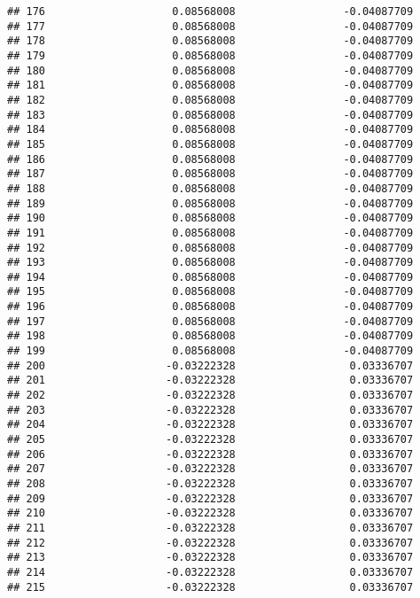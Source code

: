 \documentclass[]{article}
\begin{document}
\begin{verbatim}
## 176                    0.08568008                 -0.04087709
## 177                    0.08568008                 -0.04087709
## 178                    0.08568008                 -0.04087709
## 179                    0.08568008                 -0.04087709
## 180                    0.08568008                 -0.04087709
## 181                    0.08568008                 -0.04087709
## 182                    0.08568008                 -0.04087709
## 183                    0.08568008                 -0.04087709
## 184                    0.08568008                 -0.04087709
## 185                    0.08568008                 -0.04087709
## 186                    0.08568008                 -0.04087709
## 187                    0.08568008                 -0.04087709
## 188                    0.08568008                 -0.04087709
## 189                    0.08568008                 -0.04087709
## 190                    0.08568008                 -0.04087709
## 191                    0.08568008                 -0.04087709
## 192                    0.08568008                 -0.04087709
## 193                    0.08568008                 -0.04087709
## 194                    0.08568008                 -0.04087709
## 195                    0.08568008                 -0.04087709
## 196                    0.08568008                 -0.04087709
## 197                    0.08568008                 -0.04087709
## 198                    0.08568008                 -0.04087709
## 199                    0.08568008                 -0.04087709
## 200                   -0.03222328                  0.03336707
## 201                   -0.03222328                  0.03336707
## 202                   -0.03222328                  0.03336707
## 203                   -0.03222328                  0.03336707
## 204                   -0.03222328                  0.03336707
## 205                   -0.03222328                  0.03336707
## 206                   -0.03222328                  0.03336707
## 207                   -0.03222328                  0.03336707
## 208                   -0.03222328                  0.03336707
## 209                   -0.03222328                  0.03336707
## 210                   -0.03222328                  0.03336707
## 211                   -0.03222328                  0.03336707
## 212                   -0.03222328                  0.03336707
## 213                   -0.03222328                  0.03336707
## 214                   -0.03222328                  0.03336707
## 215                   -0.03222328                  0.03336707

\end{verbatim}
\end{document}
